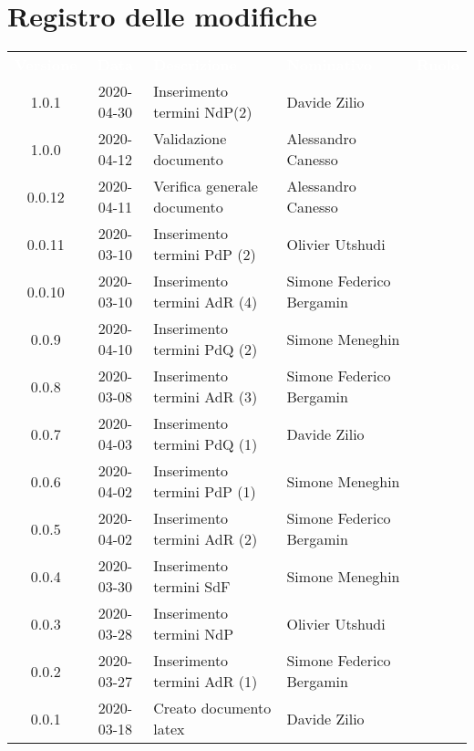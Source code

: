 \section*{Registro delle modifiche}
{
	\centering
	\begin{longtable}{ c c  C{4cm} C{3cm} C{3.5cm} }
		\textcolor{white}{\textbf{Versione}} & \textcolor{white}{\textbf{Data}} & \textcolor{white}{\textbf{Descrizione}} & \textcolor{white}{\textbf{Nominativo}} & \textcolor{white}{\textbf{Ruolo}}\\
		1.0.1 & 2020-04-30 & Inserimento termini NdP(2) & Davide Zilio &\ana{} \\
		1.0.0 & 2020-04-12 & Validazione documento & Alessandro Canesso &\RdP{}\\
		0.0.12 & 2020-04-11 & Verifica generale documento & Alessandro Canesso &\ver{}\\
		0.0.11 & 2020-03-10 & Inserimento termini PdP (2) & Olivier Utshudi &\ana{}\\
		0.0.10 & 2020-03-10 & Inserimento termini AdR (4) & Simone Federico Bergamin &\ana{}\\
		0.0.9 & 2020-04-10 & Inserimento termini PdQ (2) & Simone Meneghin &\ana{}\\
		0.0.8 & 2020-03-08 & Inserimento termini AdR (3) & Simone Federico Bergamin &\ana{}\\
		0.0.7 & 2020-04-03 & Inserimento termini PdQ (1) & Davide Zilio &\ana{}\\
		0.0.6 & 2020-04-02 & Inserimento termini PdP (1) & Simone Meneghin &\ana{}\\
		0.0.5 & 2020-04-02 & Inserimento termini AdR (2) & Simone Federico Bergamin &\ana{}\\
		0.0.4 & 2020-03-30 & Inserimento termini SdF & Simone Meneghin &\ana{}\\
		0.0.3 & 2020-03-28 & Inserimento termini NdP & Olivier Utshudi &\ana{}\\
		0.0.2 & 2020-03-27 & Inserimento termini AdR (1) & Simone Federico Bergamin &\ana{}\\
		0.0.1 & 2020-03-18 & Creato documento latex & Davide Zilio &\ana{}\\		
		
	\end{longtable}

}